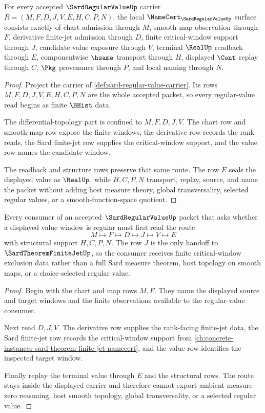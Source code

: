 \begin{theorem}
\label{thm:sard-regular-value-namecert-obligations}
For every accepted $\SardRegularValueUp$ carrier $R=(M,F,D,J,V,E,H,C,P,N)$, the local $\NameCert_{\SardRegularValueUp}$ surface consists exactly of chart admission through $M$, smooth-map observation through $F$, derivative finite-jet admission through $D$, finite critical-window support through $J$, candidate value exposure through $V$, terminal $\RealUp$ readback through $E$, componentwise $\hsame$ transport through $H$, displayed $\Cont$ replay through $C$, $\Pkg$ provenance through $P$, and local naming through $N$.
\end{theorem}
\begin{proof}
Project the carrier of \autoref{def:sard-regular-value-carrier}. Its rows $M,F,D,J,V,E,H,C,P,N$ are the whole accepted packet, so every regular-value read begins as finite $\BHist$ data.

The differential-topology part is confined to $M,F,D,J,V$. The chart row and smooth-map row expose the finite windows, the derivative row records the rank reads, the Sard finite-jet row supplies the critical-window support, and the value row names the candidate window.

The readback and structure rows preserve that same route. The row $E$ seals the displayed value as $\RealUp$, while $H,C,P,N$ transport, replay, source, and name the packet without adding host measure theory, global transversality, selected regular values, or a smooth-function-space quotient.
\end{proof}

\begin{theorem}
\label{thm:sard-regular-value-critical-window-handoff}
Every consumer of an accepted $\SardRegularValueUp$ packet that asks whether a displayed value window is regular must first read the route
$$
M\longmapsto F\longmapsto D\longmapsto J\longmapsto V\longmapsto E
$$
with structural support $H,C,P,N$. The row $J$ is the only handoff to $\SardTheoremFiniteJetUp$, so the consumer receives finite critical-window exclusion data rather than a full Sard measure theorem, host topology on smooth maps, or a choice-selected regular value.
\end{theorem}
\begin{proof}
Begin with the chart and map rows $M,F$. They name the displayed source and target windows and the finite observations available to the regular-value consumer.

Next read $D,J,V$. The derivative row supplies the rank-facing finite-jet data, the Sard finite-jet row records the critical-window support from \autoref{ch:concrete-instances-sard-theorem-finite-jet-namecert}, and the value row identifies the inspected target window.

Finally replay the terminal value through $E$ and the structural rows. The route stays inside the displayed carrier and therefore cannot export ambient measure-zero reasoning, host smooth topology, global transversality, or a selected regular value.
\end{proof}

